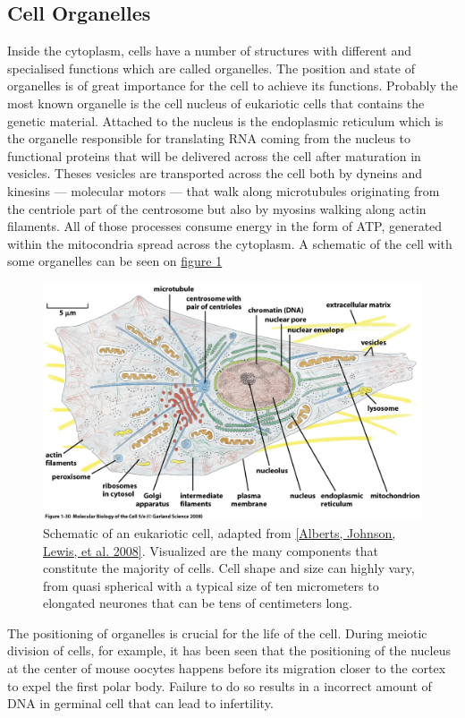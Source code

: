 \documentclass[A4paperpaper,11pt,english]{sphinxmanual}
\begin{document}
\subsection{Cell Organelles}
\label{index-latex:cell-organelles}
Inside the cytoplasm, cells have a number of structures with different and
specialised functions which are called organelles. The position and state of
organelles is of great importance for the cell to achieve its functions.
Probably the most known organelle is the cell nucleus of eukariotic cells that
contains the genetic material. Attached to the nucleus is the endoplasmic
reticulum  which is the organelle responsible for translating
RNA coming from the nucleus to functional proteins that will be delivered
across the cell after maturation in vesicles. Theses vesicles are
transported across the cell both by dyneins and kinesins — molecular motors —
that walk along microtubules originating from the centriole part of the
centrosome but also by myosins walking along actin filaments.  All of those processes
consume energy in  the form of ATP, generated within the mitocondria spread
across the cytoplasm. A schematic of the cell with some organelles can be seen
on \hyperref[index-latex:albertcell]{figure  \ref*{index-latex:albertcell}}
\begin{figure}[htbp]
\centering
\capstart

\includegraphics[width=0.800\linewidth]{figure-1-30.jpg}
\caption{Schematic of an eukariotic cell, adapted from {\hyperref[index-latex:alberts2008]{{[}Alberts, Johnson, Lewis,  et al.  2008{]}}}. Visualized are
the many components that constitute the majority of cells.  Cell shape and
size can highly vary, from quasi spherical with a typical size of ten
micrometers to elongated neurones that can be tens of centimeters long.}\label{index-latex:albertcell}\end{figure}

The positioning of organelles is crucial for the life of the cell. During
meiotic division of cells, for example, it has been seen that the positioning of
the nucleus at the center of mouse oocytes happens before its
migration closer to the cortex to expel the first polar body. Failure to do so
results in a incorrect amount of DNA in germinal cell that can lead to
infertility.
\end{document}
